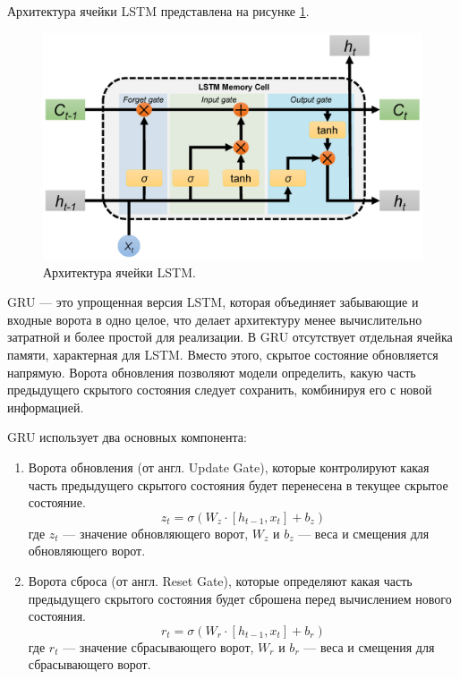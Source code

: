 \documentclass[a4paper,12pt]{extarticle}
\begin{document}
Архитектура ячейки LSTM представлена на рисунке \ref{fig:lstm_arch}.

\begin{figure}[ht]
	\centering
	\includegraphics[scale=0.1]{lstm-cell.png}
	\caption{Архитектура ячейки LSTM.}
	\label{fig:lstm_arch}
\end{figure}


GRU — это упрощенная версия LSTM, которая объединяет забывающие и входные ворота в одно целое, что делает архитектуру менее вычислительно затратной и более простой для реализации. В GRU отсутствует отдельная ячейка памяти, характерная для LSTM. Вместо этого, скрытое состояние обновляется напрямую. Ворота обновления позволяют модели определить, какую часть предыдущего скрытого состояния следует сохранить, комбинируя его с новой информацией.

GRU использует два основных компонента:
\begin{enumerate}[label=\arabic*.]
	\item Ворота обновления (от англ. Update Gate), которые контролируют какая часть предыдущего скрытого состояния будет перенесена в текущее скрытое состояние.
	\begin{equation}
		z_t = \sigma(W_z \cdot [h_{t-1}, x_t] + b_z)
	\end{equation}
	где \( z_t \) — значение обновляющего ворот, \( W_z \) и \( b_z \) — веса и смещения для обновляющего ворот.
	\item Ворота сброса (от англ. Reset Gate), которые определяют какая часть предыдущего скрытого состояния будет сброшена перед вычислением нового состояния.
	\begin{equation}
		r_t = \sigma(W_r \cdot [h_{t-1}, x_t] + b_r)
	\end{equation}
	где \( r_t \) — значение сбрасывающего ворот, \( W_r \) и \( b_r \) — веса и смещения для сбрасывающего ворот.
\end{enumerate}
\end{document}
